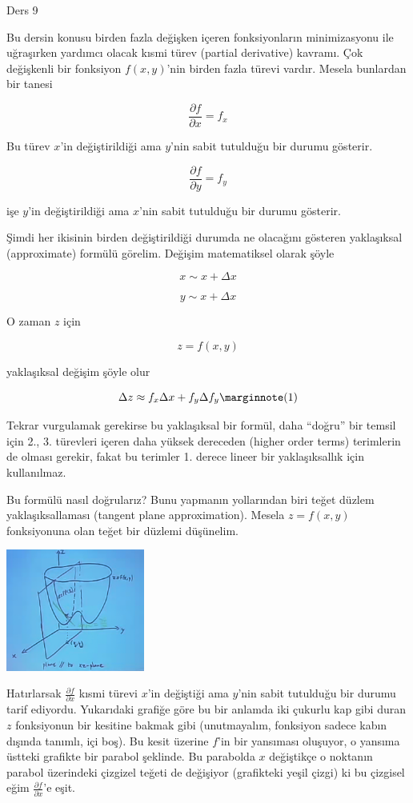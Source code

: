 \documentclass[12pt,fleqn]{article}\usepackage{../../common}
\begin{document}
Ders 9

Bu dersin konusu birden fazla değişken içeren fonksiyonların minimizasyonu ile
uğraşırken yardımcı olacak kısmi türev (partial derivative) kavramı. Çok
değişkenli bir fonksiyon $f(x,y)$'nin birden fazla türevi vardır. Mesela
bunlardan bir tanesi

$$ \frac{\partial f}{\partial x} = f_x $$

Bu türev $x$'in değiştirildiği ama $y$'nin sabit tutulduğu bir durumu
gösterir. 

$$ \frac{\partial f}{\partial y} = f_y $$

işe $y$'in değiştirildiği ama $x$'nin sabit tutulduğu bir durumu gösterir.

Şimdi her ikisinin birden değiştirildiği durumda ne olacağını gösteren
yaklaşıksal (approximate) formülü görelim. Değişim matematiksel olarak şöyle

$$ x \sim x + \Delta x $$

$$ y \sim x + \Delta x $$

O zaman $z$ için

$$ z = f(x,y) $$

yaklaşıksal değişim şöyle olur

$$
\Delta z \approx f_x\Delta x + f_y \Delta f_y
\mlabel{1}
$$

Tekrar vurgulamak gerekirse bu yaklaşıksal bir formül, daha ``doğru'' bir temsil
için 2., 3. türevleri içeren daha yüksek dereceden (higher order terms)
terimlerin de olması gerekir, fakat bu terimler 1. derece lineer bir
yaklaşıksallık için kullanılmaz.

Bu formülü nasıl doğrularız? Bunu yapmanın yollarından biri teğet düzlem
yaklaşıksallaması (tangent plane approximation). Mesela $z = f(x,y)$
fonksiyonuna olan teğet bir düzlemi düşünelim.

\includegraphics[height=4cm]{9_1.png}

Hatırlarsak $\frac{\partial f}{\partial x}$ kısmi türevi $x$'in değiştiği ama
$y$'nin sabit tutulduğu bir durumu tarif ediyordu. Yukarıdaki grafiğe göre bu
bir anlamda iki çukurlu kap gibi duran $z$ fonksiyonun bir kesitine bakmak gibi
(unutmayalım, fonksiyon sadece kabın dışında tanımlı, içi boş). Bu kesit üzerine
$f$'in bir yansıması oluşuyor, o yansıma üstteki grafikte bir parabol
şeklinde. Bu parabolda $x$ değiştikçe o noktanın parabol üzerindeki çizgizel
teğeti de değişiyor (grafikteki yeşil çizgi) ki bu çizgisel eğim
$\frac{\partial f}{\partial x}$'e eşit.
\end{document}
